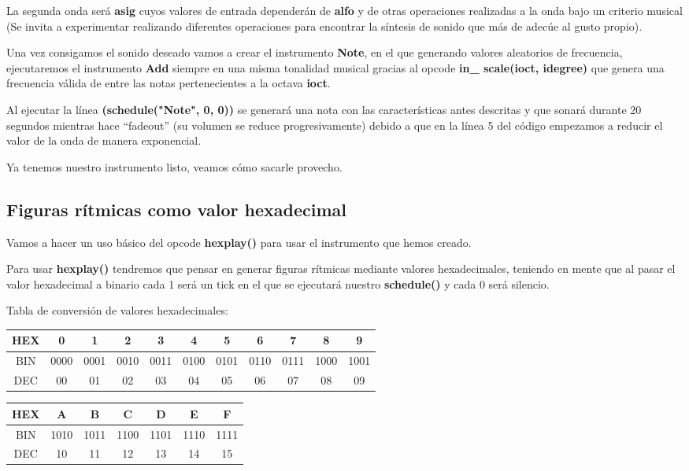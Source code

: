 La segunda onda será \textbf{asig} cuyos valores de entrada dependerán de \textbf{alfo} y de otras operaciones realizadas a la onda bajo un criterio musical (Se invita a experimentar realizando diferentes operaciones para encontrar la síntesis de sonido que más de adecúe al gusto propio).

Una vez consigamos el sonido deseado vamos a crear el instrumento \textbf{Note}, en el que generando valores aleatorios de frecuencia, ejecutaremos el instrumento \textbf{Add} siempre en una misma tonalidad musical gracias al opcode \textbf{in\_ scale(ioct, idegree)} que genera una frecuencia válida de entre las notas pertenecientes a la octava \textbf{ioct}.

Al ejecutar la línea \textbf{(schedule("Note", 0, 0))} se generará una nota con las características antes descritas y que sonará durante 20 segundos mientras hace ``fadeout'' (su volumen se reduce progresivamente) debido a que en la línea 5 del código empezamos a reducir el valor de la onda de manera exponencial.

Ya tenemos nuestro instrumento listo, veamos cómo sacarle provecho.

\subsection{Figuras rítmicas como valor hexadecimal}

Vamos a hacer un uso básico del opcode \textbf{hexplay()} para usar el instrumento que hemos creado. 

Para usar \textbf{hexplay()} tendremos que pensar en generar figuras rítmicas mediante valores hexadecimales, teniendo en mente que al pasar el valor hexadecimal a binario cada 1 será un tick en el que se ejecutará nuestro \textbf{schedule()} y cada 0 será silencio.

Tabla de conversión de valores hexadecimales:
\begin{center}
 \begin{tabular}{||c c c c c c c c c c c||} 
 \hline
 HEX & 0 & 1 & 2 & 3 & 4 & 5 & 6 & 7 & 8 & 9 \\
 \hline
 BIN & 0000 & 0001 & 0010 & 0011 & 0100 & 0101 & 0110 & 0111 & 1000 & 1001 \\ 
 \hline
 DEC & 00 & 01 & 02 & 03 & 04 & 05 & 06 & 07 & 08 & 09\\
 \hline
\end{tabular}
\end{center}

\begin{center}
 \begin{tabular}{||c c c c c c c||} 
 \hline
 HEX & A & B & C & D & E & F \\
 \hline
 BIN & 1010 & 1011 & 1100 & 1101 & 1110 & 1111\\ 
 \hline
 DEC & 10 & 11 & 12 & 13 & 14 & 15 \\
 \hline
\end{tabular}
\end{center}
\pagebreak
{}

